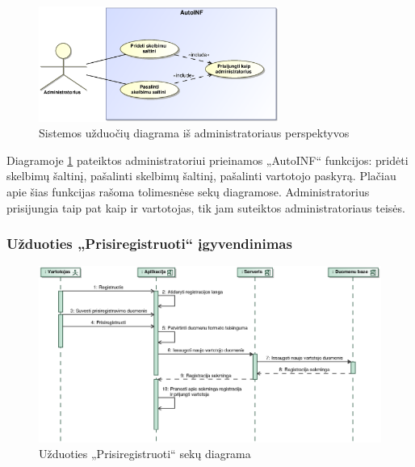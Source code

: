 \documentclass[12pt]{article}
\begin{document}
	\begin{figure}[h]
		\begin{center}
			\includegraphics[width=0.7\textwidth]{TikslaiAdministratorius.eps}
			\caption{Sistemos užduočių diagrama iš administratoriaus perspektyvos\label{UseCaseAdmin}}
		\end{center}
	\end{figure}	
	
	Diagramoje \ref{UseCaseAdmin} pateiktos administratoriui prieinamos „AutoINF“ funkcijos: pridėti skelbimų šaltinį, pašalinti skelbimų šaltinį, pašalinti vartotojo paskyrą. Plačiau apie šias funkcijas rašoma tolimesnėse sekų diagramose. Administratorius prisijungia taip pat kaip ir vartotojas, tik jam suteiktos administratoriaus teisės.
	\pagebreak
	
	\subsubsection{Užduoties „Prisiregistruoti“ įgyvendinimas}
	
	\begin{figure}[h]
		\begin{center}
			\includegraphics[width=\textwidth]{Prisiregistruoti.eps}
			\caption{Užduoties „Prisiregistruoti“ sekų diagrama\label{RegisterSeq}}
		\end{center}
	\end{figure}
	
\end{document}
